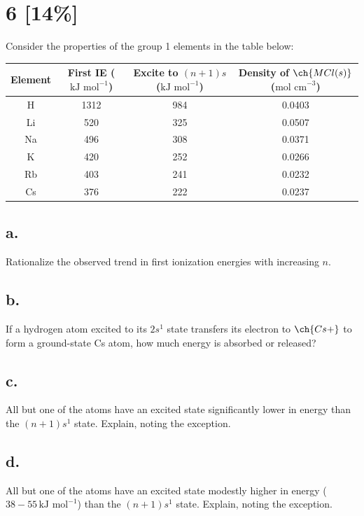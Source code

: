 \documentclass[11pt]{article}
\begin{document}
\newpage
\section{6 [14\%]}
Consider the properties of the group 1 elements in the table below:
\begin{center}
\begin{tabular}{|c|c|c|c|}
\hline
Element & First IE ($\text{kJ mol}^{-1}$) & Excite to $(n+1)s$ ($\text{kJ mol}^{-1}$) & Density of $\ch{MCl(s)}$ ($\text{mol cm}^{-3}$)\\
\hline
H & 1312 & 984 & 0.0403 \\
Li & 520 & 325 & 0.0507 \\
Na & 496 & 308 & 0.0371 \\
K & 420 & 252 & 0.0266 \\
Rb & 403 & 241 & 0.0232 \\
Cs & 376 & 222 & 0.0237 \\
\hline
\end{tabular}
\end{center}

\subsection*{a.} Rationalize the observed trend in first ionization energies with increasing $n$.
\vspace{2cm}

\subsection*{b.} If a hydrogen atom excited to its $2s^1$ state transfers its electron to $\ch{Cs+}$ to form a ground-state Cs atom, how much energy is absorbed or released?
\vspace{2.5cm}

\subsection*{c.} All but one of the atoms have an excited state significantly lower in energy than the $(n+1)s^1$ state. Explain, noting the exception.
\vspace{2.5cm}

\subsection*{d.} All but one of the atoms have an excited state modestly higher in energy ($38-55\,\text{kJ mol}^{-1}$) than the $(n+1)s^1$ state. Explain, noting the exception.
\vspace{2.5cm}
\end{document}
